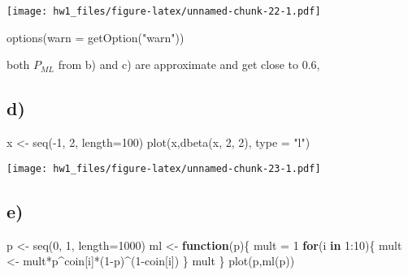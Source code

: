 \documentclass[
]{article}
\newenvironment{Shaded}{\begin{snugshade}}{\end{snugshade}}
\newcommand{\AttributeTok}[1]{\textcolor[rgb]{0.77,0.63,0.00}{#1}}
\newcommand{\ControlFlowTok}[1]{\textcolor[rgb]{0.13,0.29,0.53}{\textbf{#1}}}
\newcommand{\DecValTok}[1]{\textcolor[rgb]{0.00,0.00,0.81}{#1}}
\newcommand{\FunctionTok}[1]{\textcolor[rgb]{0.00,0.00,0.00}{#1}}
\newcommand{\NormalTok}[1]{#1}
\newcommand{\OtherTok}[1]{\textcolor[rgb]{0.56,0.35,0.01}{#1}}
\newcommand{\SpecialCharTok}[1]{\textcolor[rgb]{0.00,0.00,0.00}{#1}}
\newcommand{\StringTok}[1]{\textcolor[rgb]{0.31,0.60,0.02}{#1}}
\begin{document}
\texttt{[image: hw1\_files/figure-latex/unnamed-chunk-22-1.pdf]}

\begin{Shaded}
\begin{Highlighting}[]
\FunctionTok{options}\NormalTok{(}\AttributeTok{warn =} \FunctionTok{getOption}\NormalTok{(}\StringTok{"warn"}\NormalTok{))}
\end{Highlighting}
\end{Shaded}

both \(P_{ML}\) from b) and c) are approximate and get close to 0.6,

\hypertarget{d-2}{%
\subsection{d)}\label{d-2}}

\begin{Shaded}
\begin{Highlighting}[]
\NormalTok{x }\OtherTok{\textless{}{-}} \FunctionTok{seq}\NormalTok{(}\SpecialCharTok{{-}}\DecValTok{1}\NormalTok{, }\DecValTok{2}\NormalTok{, }\AttributeTok{length=}\DecValTok{100}\NormalTok{)}
\FunctionTok{plot}\NormalTok{(x,}\FunctionTok{dbeta}\NormalTok{(x, }\DecValTok{2}\NormalTok{, }\DecValTok{2}\NormalTok{), }\AttributeTok{type =} \StringTok{"l"}\NormalTok{)}
\end{Highlighting}
\end{Shaded}

\texttt{[image: hw1\_files/figure-latex/unnamed-chunk-23-1.pdf]}

\hypertarget{e-2}{%
\subsection{e)}\label{e-2}}

\begin{Shaded}
\begin{Highlighting}[]
\NormalTok{p }\OtherTok{\textless{}{-}} \FunctionTok{seq}\NormalTok{(}\DecValTok{0}\NormalTok{, }\DecValTok{1}\NormalTok{, }\AttributeTok{length=}\DecValTok{1000}\NormalTok{)}
\NormalTok{ml }\OtherTok{\textless{}{-}} \ControlFlowTok{function}\NormalTok{(p)\{}
\NormalTok{  mult }\OtherTok{=} \DecValTok{1} 
  \ControlFlowTok{for}\NormalTok{(i }\ControlFlowTok{in} \DecValTok{1}\SpecialCharTok{:}\DecValTok{10}\NormalTok{)\{}
\NormalTok{    mult }\OtherTok{\textless{}{-}}\NormalTok{ mult}\SpecialCharTok{*}\NormalTok{p}\SpecialCharTok{\^{}}\NormalTok{coin[i]}\SpecialCharTok{*}\NormalTok{(}\DecValTok{1}\SpecialCharTok{{-}}\NormalTok{p)}\SpecialCharTok{\^{}}\NormalTok{(}\DecValTok{1}\SpecialCharTok{{-}}\NormalTok{coin[i])}
\NormalTok{  \}}
\NormalTok{  mult}
\NormalTok{\}}
\FunctionTok{plot}\NormalTok{(p,}\FunctionTok{ml}\NormalTok{(p))}
\end{Highlighting}
\end{Shaded}
\end{document}
